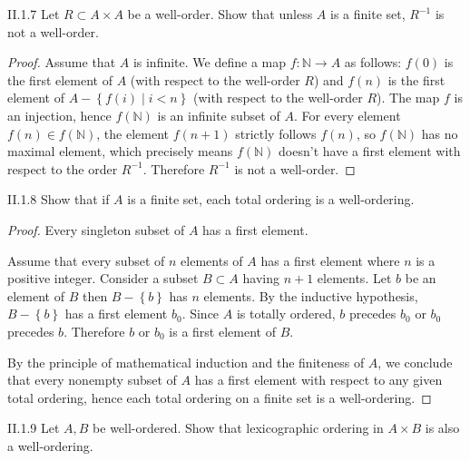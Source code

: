 \begin{problem}{II.1.7}
Let \(R \subset A \times A\) be a well-order. Show that unless \(A\) is a finite set, \(R^{-1}\) is not a well-order.
\end{problem}

\begin{proof}
	Assume that \( A \) is infinite. We define a map \( f: \mathbb{N} \to A \) as follows: \( f(0) \) is the first element of \( A \) (with respect to the well-order \( R \)) and \( f(n) \) is the first element of \( A  - \left\{ f(i) \mid i < n \right\} \) (with respect to the well-order \( R \)). The map \( f \) is an injection, hence \( f(\mathbb{N}) \) is an infinite subset of \( A \). For every element \( f(n) \in f(\mathbb{N}) \), the element \( f(n + 1) \) strictly follows \( f(n) \), so \( f(\mathbb{N}) \) has no maximal element, which precisely means \( f(\mathbb{N}) \) doesn't have a first element with respect to the order \( R^{-1} \). Therefore \( R^{-1} \) is not a well-order.
\end{proof}

\begin{problem}{II.1.8}
Show that if \(A\) is a finite set, each total ordering is a well-ordering.
\end{problem}

\begin{proof}
	Every singleton subset of \(A\) has a first element.

	Assume that every subset of \(n\) elements of \(A\) has a first element where \(n\) is a positive integer. Consider a subset \( B \subset A \) having \( n + 1 \) elements. Let \( b \) be an element of \( B \) then \( B - \left\{ b \right\} \) has \( n \) elements. By the inductive hypothesis, \( B - \left\{ b \right\} \) has a first element \( b_{0} \). Since \(A\) is totally ordered, \( b \) precedes \( b_{0} \) or \( b_{0} \) precedes \( b \). Therefore \( b \) or \( b_{0} \) is a first element of \( B \).

	By the principle of mathematical induction and the finiteness of \(A\), we conclude that every nonempty subset of \(A\) has a first element with respect to any given total ordering, hence each total ordering on a finite set is a well-ordering.
\end{proof}

\begin{problem}{II.1.9}\label{problem:II.1.9}
Let \(A, B\) be well-ordered. Show that lexicographic ordering in \(A \times B\) is also a well-ordering.
\end{problem}

